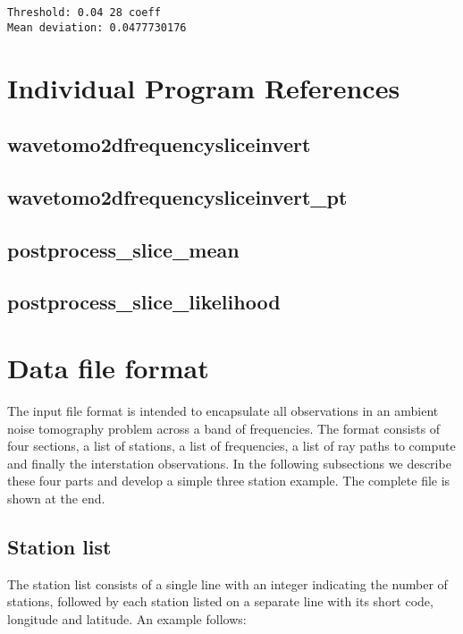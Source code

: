 \documentclass[a4paper,12pt]{article}
\begin{document}
\begin{verbatim}
Threshold: 0.04 28 coeff
Mean deviation: 0.0477730176
\end{verbatim}




\appendix

\section{Individual Program References}

\subsection{wavetomo2dfrequencysliceinvert}

\subsection{wavetomo2dfrequencysliceinvert\_pt}

\subsection{postprocess\_slice\_mean}

\subsection{postprocess\_slice\_likelihood}


\section{Data file format}
\label{sec:fileformat}

The input file format is intended to encapsulate all observations in
an ambient noise tomography problem across a band of frequencies. The
format consists of four sections, a list of stations, a list of
frequencies, a list of ray paths to compute and finally the
interstation observations.  In the following subsections we describe
these four parts and develop a simple three station example. The
complete file is shown at the end.

\subsection{Station list}

The station list consists of a single line with an integer indicating
the number of stations, followed by each station listed on a separate
line with its short code, longitude and latitude. An example follows:
\end{document}

